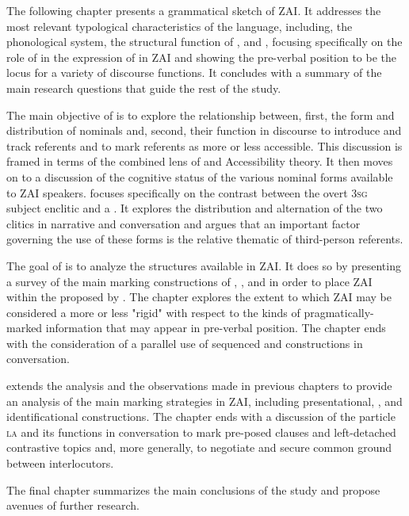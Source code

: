 The following chapter presents a grammatical sketch of ZAI. It addresses the most relevant typological characteristics of the language, including, the phonological system, the structural function of , and , focusing specifically on the role of  in the expression of  in ZAI and showing the pre-verbal position to be the locus for a variety of discourse functions. It concludes with a summary of the main research questions that guide the rest of the study.

The main objective of  is to explore the relationship between, first, the form and distribution of nominals and, second, their function in discourse to introduce and track referents and to mark referents as more or less accessible.  This discussion is framed in terms of the combined lens of  and Accessibility theory. It then moves on to a discussion of the cognitive status of the various nominal forms available to ZAI speakers.  focuses specifically on the contrast between the overt \textsc{3sg} subject enclitic and a . It explores the distribution and alternation of the two  clitics in narrative and conversation and argues that an important factor governing the use of these forms is the relative thematic  of third-person referents.  

The goal of  is to analyze the  structures available in ZAI. It does so by presenting a survey of the main  marking constructions of , , and  \citep{lambrecht1994} in order to place ZAI  within the  proposed by \citet{vanvalin1999}. The chapter explores the extent to which ZAI may be considered a more or less "rigid"  with respect to the kinds of pragmatically-marked information that may appear in pre-verbal position. The chapter ends with the consideration of a parallel use of sequenced  and  constructions in conversation. 

 extends the analysis and the observations made in previous chapters to provide an analysis of the main  marking strategies in ZAI, including presentational, , and identificational constructions. The chapter ends with a discussion of the particle \textsc{la} and its functions in conversation to mark pre-posed  clauses and left-detached contrastive topics and, more generally, to negotiate and secure common ground between interlocutors. 


The final chapter summarizes the main conclusions of the study and propose avenues of further research.





